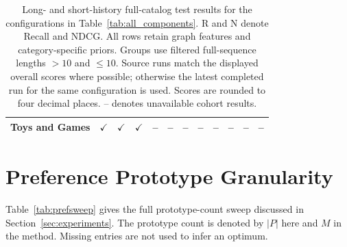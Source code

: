 \documentclass[11pt]{article}
\begin{document}
\begin{table}[!t]
{\begin{tabular}{lccc|cccc|cccc}
Toys and Games & $\checkmark$ & $\checkmark$ & $\checkmark$ & -- & -- & -- & -- & -- & -- & -- & --\\
\bottomrule
\end{tabular}%
}
\caption{Long- and short-history full-catalog test results for the configurations in Table~\ref{tab:all_components}. R and N denote Recall and NDCG. All rows retain graph features and category-specific priors. Groups use filtered full-sequence lengths $>10$ and $\leq10$. Source runs match the displayed overall scores where possible; otherwise the latest completed run for the same configuration is used. Scores are rounded to four decimal places. -- denotes unavailable cohort results.}
\label{tab:main_length_groups}
\end{table}

\section{Preference Prototype Granularity}

Table~\ref{tab:prefsweep} gives the full prototype-count sweep discussed in Section~\ref{sec:experiments}. The prototype count is denoted by $|P|$ here and $M$ in the method. Missing entries are not used to infer an optimum.
\end{document}
